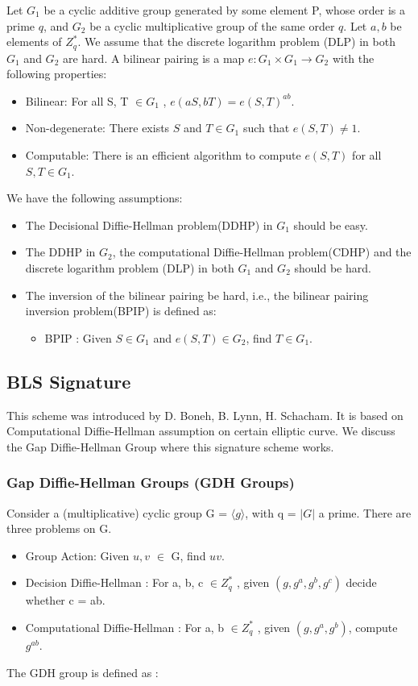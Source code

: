 \documentclass[11pt,a4paper]{llncs}
\begin{document}
Let $G_1$ be a cyclic additive group generated by some element P, whose order is a prime $q$, and $G_2$ be a cyclic multiplicative group of the
same order $q$. Let $a,b$ be elements of $Z_q^*$. We assume that
the discrete logarithm problem (DLP) in both $G_1$ and $G_2$ are
hard. A bilinear pairing is a map $e:G_1\times G_1\rightarrow
G_2$ with the following properties:

\begin{itemize}
\item Bilinear: For all S, T $\in G_1$ ,  $e(aS,bT)=e(S,T)^{ab}$.

\item Non-degenerate: There exists $S$ and $T\in G_1$ such that
$e(S,T)\neq 1$.

\item Computable: There is an efficient algorithm to compute $e(S,T)$
for all $S,T\in G_1$. 
\end{itemize}
We have the following assumptions:
\begin{itemize}

\item The Decisional Diffie-Hellman problem(DDHP) in $G_1$ should be easy.
\item The DDHP in $G_2$, the computational Diffie-Hellman problem(CDHP) and the
discrete logarithm problem (DLP) in both $G_1$ and $G_2$ should be hard.
\item The inversion of the bilinear pairing be hard,
i.e., the bilinear pairing inversion problem(BPIP) is
defined as:\par

\begin{itemize}
\item BPIP : Given $S\in G_1$ and $e(S,T)\in G_2$, find $T\in G_1$.
\end{itemize}
\end{itemize}

\subsection{BLS Signature\cite{bls}}
\label{sec:bls}
This scheme was introduced by D. Boneh, B. Lynn, H. Schacham. It is based on Computational Diffie-Hellman assumption on certain elliptic curve. We discuss the Gap Diffie-Hellman Group where this signature scheme works.
\subsubsection{Gap Diffie-Hellman Groups (GDH Groups)}
Consider a (multiplicative) cyclic group G = $\langle g\rangle$, with q = $\vert G\vert$ a prime. There are three problems on G.
\begin{itemize}
\item Group Action: Given $u, v$ $\in$ G, find $uv$.
\item Decision Diffie-Hellman : For a, b, c $\in Z^*_q$ , given $(g, g^a , g^b , g^c )$ decide whether c = ab.
\item Computational Diffie-Hellman : For a, b $\in Z^*_q$ , given $(g, g^a , g^b )$, compute $g^{ab}$.
\end{itemize}
The GDH group is defined as :
\end{document}
